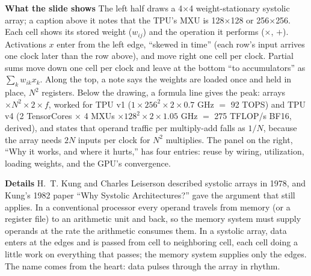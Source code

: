 \documentclass[11pt,letterpaper]{article}
\newcommand{\para}[1]{\medskip\noindent\textbf{#1}\quad}
\begin{document}
\para{What the slide shows} The left half draws a 4$\times$4 weight-stationary systolic array; a caption above it notes that the TPU's MXU is 128$\times$128 or 256$\times$256. Each cell shows its stored weight ($w_{ij}$) and the operation it performs ($\times$, $+$). Activations $x$ enter from the left edge, ``skewed in time'' (each row's input arrives one clock later than the row above), and move right one cell per clock. Partial sums move down one cell per clock and leave at the bottom ``to accumulators'' as $\sum_k w_{ik}x_k$. Along the top, a note says the weights are loaded once and held in place, $N^2$ registers. Below the drawing, a formula line gives the peak: arrays $\times N^2 \times 2 \times f$, worked for TPU v1 ($1\times256^2\times2\times0.7$ GHz $=$ 92 TOPS) and TPU v4 (2 TensorCores $\times$ 4 MXUs $\times128^2\times2\times1.05$ GHz $=$ 275 TFLOP/s BF16, derived), and states that operand traffic per multiply-add falls as $1/N$, because the array needs $2N$ inputs per clock for $N^2$ multiplies. The panel on the right, ``Why it works, and where it hurts,'' has four entries: reuse by wiring, utilization, loading weights, and the GPU's convergence.

\para{Details} H.~T. Kung and Charles Leiserson described systolic arrays in 1978, and Kung's 1982 paper ``Why Systolic Architectures?'' gave the argument that still applies. In a conventional processor every operand travels from memory (or a register file) to an arithmetic unit and back, so the memory system must supply operands at the rate the arithmetic consumes them. In a systolic array, data enters at the edges and is passed from cell to neighboring cell, each cell doing a little work on everything that passes; the memory system supplies only the edges. The name comes from the heart: data pulses through the array in rhythm.
\end{document}
